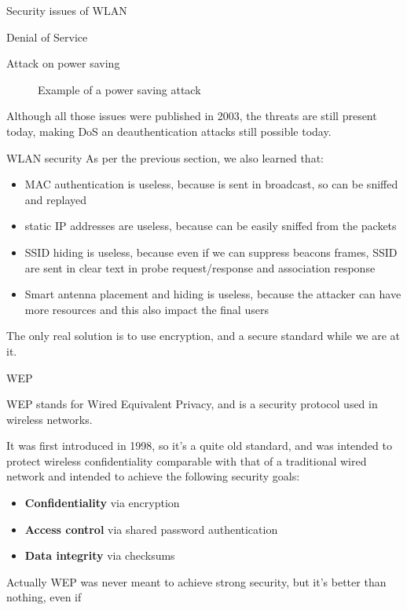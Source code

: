 \begin{section}{Security issues of WLAN}
\begin{subsection}{Denial of Service}
\begin{subsubsection}{Attack on power saving}
\begin{figure}[h]
        \caption{Example of a power saving attack}
      \end{figure}

    \end{subsubsection}

  \end{subsection}
  Although all those issues were published in 2003, the threats are still present today, making DoS 
  an deauthentication attacks still possible today.

\end{section}
\begin{section}{WLAN security}
    As per the previous section, we also learned that:
    \begin{itemize}
      \item MAC authentication is useless, because is sent in broadcast, so can be sniffed and replayed
      \item static IP addresses are useless, because can be easily sniffed from the packets
      \item SSID hiding is useless, because even if we can suppress beacons frames, SSID are sent 
        in clear text in probe request/response and association response
      \item Smart antenna placement and hiding is useless, because the attacker can have more resources 
        and this also impact the final users
    \end{itemize}
    The only real solution is to use encryption, and a secure standard while we are at it.
  \begin{subsection}{WEP}
    \begin{boxH}
      WEP stands for Wired Equivalent Privacy, and is a security protocol used in wireless networks.
    \end{boxH}
    It was first introduced in 1998, so it's a quite old standard, and was intended to protect 
    wireless confidentiality comparable with that of a traditional wired network and intended to 
    achieve the following security goals:
    \begin{itemize}
      \item \textbf{Confidentiality} via encryption 
      \item \textbf{Access control} via shared password authentication
      \item \textbf{Data integrity} via checksums
    \end{itemize}
    Actually WEP was never meant to achieve strong security, but it's better than nothing, even if 

\end{subsection}
\end{section}
